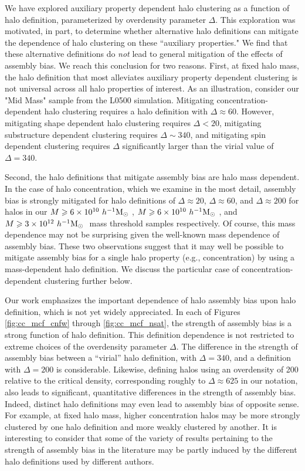 \documentclass[usenatbib,fleqn]{mnras}
\begin{document}
We have explored auxiliary property dependent halo clustering as a function of halo definition, parameterized by overdensity parameter $\Delta$. This exploration was motivated, in part, to determine whether 
alternative halo definitions can mitigate the dependence of halo clustering on these ``auxiliary properties." We find that these alternative definitions do {\em not} lead to general mitigation of the effects of assembly bias. We reach this conclusion for two reasons. First, at fixed halo mass, the halo definition that most alleviates auxiliary property dependent clustering is not universal across all halo properties of interest. As an illustration, consider our "Mid Mass" sample from the L0500 simulation. Mitigating concentration-dependent halo clustering requires a halo definition with $\Delta \approx 60$. However, mitigating shape dependent halo clustering requires $\Delta < 20$, mitigating substructure dependent clustering requires $\Delta \sim 340$, and mitigating spin dependent clustering requires $\Delta$ significantly larger than the virial value of $\Delta = 340$. 

Second, the halo definitions that mitigate assembly bias are halo mass dependent. In the case of halo concentration, which we examine in the most detail, assembly bias is strongly mitigated for halo definitions of $\Delta \approx 20$, $\Delta \approx 60$, and $\Delta \approx 200$ for halos in our $M \geqslant 6 \times 10^{10} \ h^{-1}\mathrm{M}_{\odot}~$, $M \geqslant 6 \times 10^{10} \ h^{-1}\mathrm{M}_{\odot}~$, and $M \geqslant 3 \times 10^{12} \ h^{-1}\mathrm{M}_{\odot}~$ mass threshold samples respectively. Of course, this 
mass dependence may not be surprising given the well-known mass dependence 
of assembly bias. These two observations suggest that it may well be possible to mitigate assembly bias for a single halo property (e.g., concentration) by using a mass-dependent halo definition. We discuss the particular case of concentration-dependent clustering further below.

Our work emphasizes the important dependence of halo assembly bias upon halo definition, which is not yet widely appreciated. In each of Figures \ref{fig:cc_mcf_cnfw} through \ref{fig:cc_mcf_nsat}, the strength of assembly bias is a strong function of halo definition. This definition dependence is not restricted to extreme choices of the overdensity parameter $\Delta$. The difference in the strength of assembly bias between a ``virial'' halo definition, with $\Delta=340$, and a definition with $\Delta=200$ is considerable. Likewise, defining halos using an overdensity of 200 relative to the critical density, corresponding roughly to $\Delta \approx 625$ in our notation, also leads to significant, quantitative differences in the strength of assembly bias. Indeed, distinct halo definitions may even lead to assembly bias of opposite sense. For example, at fixed halo mass, higher concentration halos may be more strongly clustered by one halo definition and more weakly clustered by another. It is interesting to consider that some of the variety of results pertaining to the strength of assembly bias in the literature may be partly induced by the different halo definitions used by different authors.
\end{document}
